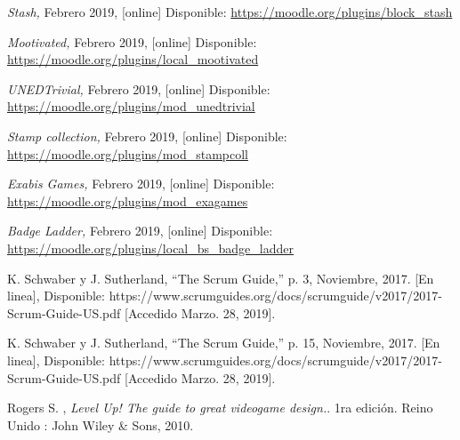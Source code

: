 \begin{thebibliography}{9}
        \textit{Stash,}
        Febrero 2019, [online] Disponible:  
        \url{https://moodle.org/plugins/block_stash}
    
        \textit{Mootivated,}
        Febrero 2019, [online] Disponible:  
        \url{https://moodle.org/plugins/local_mootivated}
    
        \textit{UNEDTrivial,}
        Febrero 2019, [online] Disponible:  
        \url{https://moodle.org/plugins/mod_unedtrivial}
    
        \textit{Stamp collection,}
        Febrero 2019, [online] Disponible:  
        \url{https://moodle.org/plugins/mod_stampcoll}
    
        \textit{Exabis Games,}
        Febrero 2019, [online] Disponible:  
        \url{https://moodle.org/plugins/mod_exagames}
    
        \textit{Badge Ladder,}
        Febrero 2019, [online] Disponible:  
        \url{https://moodle.org/plugins/local_bs_badge_ladder}


    
        K. Schwaber y J. Sutherland, “The Scrum Guide,” p. 3, Noviembre, 2017. [En linea], Disponible:
        https://www.scrumguides.org/docs/scrumguide/v2017/2017-Scrum-Guide-US.pdf [Accedido Marzo. 28, 2019].
        
        K. Schwaber y J. Sutherland, “The Scrum Guide,” p. 15, Noviembre, 2017. [En linea], Disponible:
        https://www.scrumguides.org/docs/scrumguide/v2017/2017-Scrum-Guide-US.pdf [Accedido Marzo. 28, 2019].
        
\begin{comment}
    \bibitem{conceptoDJLogros}
        Blair, Lucas \& Bowers, Clint \& Cannon-Bowers, Janis \& Gonzalez-Holland, Emily. {\it Understanding the Role of Achievements in Game-Based Learning. International Journal of Serious Games.} , December 2016 
    
\end{comment}    
    
        Rogers S. , \textit{Level Up! The guide to great videogame design.}. 1ra edición. Reino Unido : John Wiley \& Sons, 2010. 
        

\end{thebibliography}
